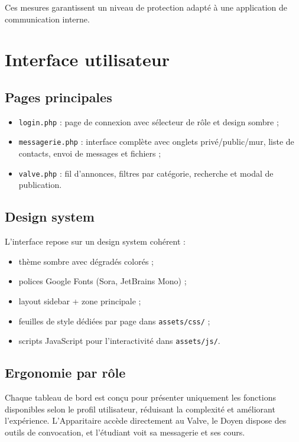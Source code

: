 \documentclass[12pt,a4paper]{article}
\begin{document}
Ces mesures garantissent un niveau de protection adapté à une application de communication interne.

\section{Interface utilisateur}

\subsection{Pages principales}

\begin{itemize}
  \item \texttt{login.php} : page de connexion avec sélecteur de rôle et design sombre ;
  \item \texttt{messagerie.php} : interface complète avec onglets privé/public/mur, liste de contacts, envoi de messages et fichiers ;
  \item \texttt{valve.php} : fil d'annonces, filtres par catégorie, recherche et modal de publication.
\end{itemize}

\subsection{Design system}

L'interface repose sur un design system cohérent :
\begin{itemize}
  \item thème sombre avec dégradés colorés ;
  \item polices Google Fonts (Sora, JetBrains Mono) ;
  \item layout sidebar + zone principale ;
  \item feuilles de style dédiées par page dans \texttt{assets/css/} ;
  \item scripts JavaScript pour l'interactivité dans \texttt{assets/js/}.
\end{itemize}

\subsection{Ergonomie par rôle}

Chaque tableau de bord est conçu pour présenter uniquement les fonctions disponibles selon le profil utilisateur, réduisant la complexité et améliorant l'expérience. L'Apparitaire accède directement au Valve, le Doyen dispose des outils de convocation, et l'étudiant voit sa messagerie et ses cours.
\end{document}
